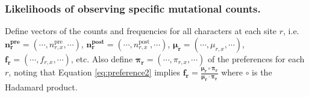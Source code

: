 \documentclass[twocolumn]{bmcart}%
\begin{document}
\subsubsection*{Likelihoods of observing specific mutational counts.}
Define vectors of the counts and frequencies for all characters at each site $r$, i.e. $\mathbf{n_r^{\textbf{pre}}}= \left(\cdots, n_{r,x}^{\textrm{pre}}, \cdots\right)$, $\mathbf{n_r^{\textbf{post}}}= \left(\cdots, n_{r,x}^{\textrm{post}}, \cdots\right)$, $\boldsymbol{\mathbf{\mu_r}} = \left(\cdots, \mu_{r,x}, \cdots\right)$, $\boldsymbol{\mathbf{f_r}} = \left(\cdots, f_{r,x}, \cdots\right)$, etc. Also define $\boldsymbol{\mathbf{\pi_r}}= \left(\cdots, \pi_{r,x}, \cdots\right)$ of the preferences for each $r$, noting that Equation \ref{eq:preference2} implies $\boldsymbol{\mathbf{f_r}} = \frac{\boldsymbol{\mathbf{\mu_r}}\circ\boldsymbol{\mathbf{\pi_r}}}{\boldsymbol{\mathbf{\mu_r}}\cdot \boldsymbol{\mathbf{\pi_r}}}$ where $\circ$ is the Hadamard product.
\end{document}
